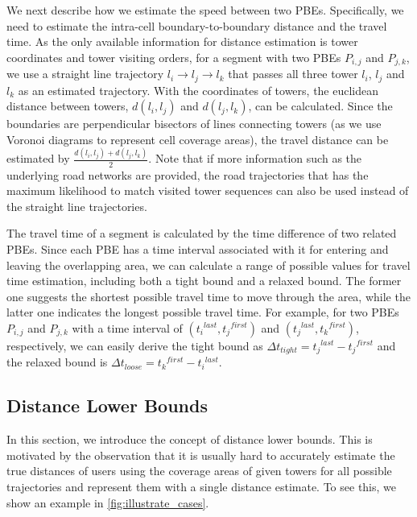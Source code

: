 We next describe how we estimate the speed between two PBEs. Specifically, we need to estimate the intra-cell boundary-to-boundary distance and the travel time. As the only available information for distance estimation is tower coordinates and tower visiting orders, for a segment with two PBEs $P_{i,j}$ and $P_{j,k}$, we use a straight line trajectory $l_i \rightarrow l_j \rightarrow l_k$ that passes all three tower $l_i$, $l_j$ and $l_k$ as an estimated trajectory. With the coordinates of towers, the euclidean distance between towers, $d(l_i,l_j)$ and $d(l_j,l_k)$, can be calculated. Since the boundaries are perpendicular bisectors of lines connecting towers (as we use Voronoi diagrams to represent cell coverage areas), the travel distance can be estimated by $\frac{d(l_i,l_j) + d(l_j,l_k)}{2}$. Note that if more information such as the underlying road networks are provided, the road trajectories that has the maximum likelihood to match visited tower sequences can also be used instead of the straight line trajectories.

The travel time of a segment is calculated by the time difference of two related PBEs. Since each PBE has a time interval associated with it for entering and leaving the overlapping area, we can calculate a range of possible values for travel time estimation, including both a tight bound and a relaxed bound. The former one suggests the shortest possible travel time to move through the area, while the latter one indicates the longest possible travel time. For example, for two PBEs $P_{i,j}$ and $P_{j,k}$ with a time interval of $({t_i}^{last}, {t_j}^{first})$ and $({t_j}^{last}, {t_k}^{first})$, respectively, we can easily derive the tight bound as $\Delta t_{tight} = {t_j}^{last} - {t_j}^{first}$ and the relaxed bound is $\Delta t_{loose} = {t_k}^{first} - {t_i}^{last}$.

\subsection{Distance Lower Bounds}

In this section, we introduce the concept of distance lower bounds. This is motivated by the observation that it is usually hard to accurately estimate the true distances of users using the coverage areas of given towers for all possible trajectories and represent them with a single distance estimate. To see this, we show an example in \autoref{fig:illustrate_cases}.

